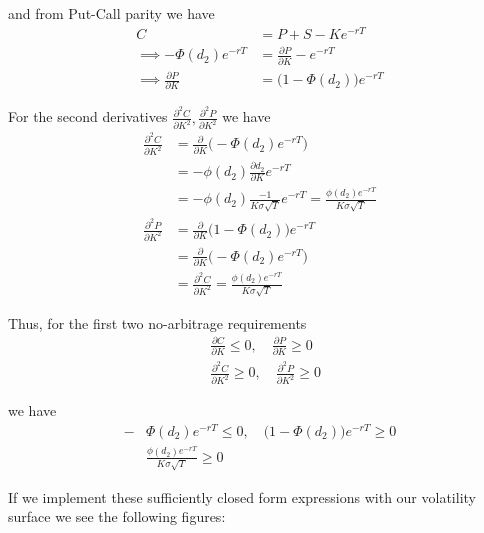 \documentclass[11pt]{article}
\begin{document}
and from Put-Call parity we have
\begin{align*}
	C &= P + S - Ke^{-rT} \\
	\implies -\Phi(d_2)e^{-rT} &= \frac{\partial P}{\partial K} - e^{-rT} \\
	\implies \frac{\partial P}{\partial K} &= \big(1 - \Phi(d_2)\big)e^{-rT}
\end{align*}

For the second derivatives $\frac{\partial^2 C}{\partial K^2}, \frac{\partial^2 P}{\partial K^2}$ we have
\begin{align*}
	\frac{\partial^2 C}{\partial K^2} &= \frac{\partial}{\partial K} \big( -\Phi(d_2)e^{-rT} \big) \\
	&= -\phi(d_2)\frac{\partial d_2}{\partial K} e^{-rT} \\
	&= -\phi(d_2)\frac{-1}{K\sigma\sqrt{T}}e^{-rT} = \frac{\phi(d_2)e^{-rT}}{K\sigma\sqrt{T}} \\
	\frac{\partial^2 P}{\partial K^2} &= \frac{\partial}{\partial K} \big(1 - \Phi(d_2)\big)e^{-rT} \\
	&= \frac{\partial}{\partial K}\big( -\Phi(d_2)e^{-rT} \big) \\
	&= \frac{\partial^2 C}{\partial K^2} = \frac{\phi(d_2)e^{-rT}}{K\sigma\sqrt{T}}
\end{align*}

Thus, for the first two no-arbitrage requirements
\begin{align*}
	&\frac{\partial C}{\partial K} \leq 0,\quad \frac{\partial P}{\partial K} \geq 0 \\
	&\frac{\partial^2 C}{\partial K^2} \geq 0,\quad \frac{\partial^2 P}{\partial K^2} \geq 0
\end{align*}

we have
\begin{align*}
	-&\Phi(d_2)e^{-rT} \leq 0,\quad \big(1 - \Phi(d_2)\big)e^{-rT} \geq 0 \\
	&\frac{\phi(d_2)e^{-rT}}{K\sigma\sqrt{T}} \geq 0
\end{align*}

If we implement these sufficiently closed form expressions with our volatility surface we see the following figures:
\end{document}
